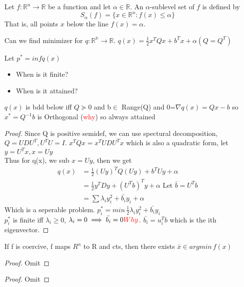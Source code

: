 \begin{definition}
  Let $f: \mathbb R^n \to \mathbb R$ be a function and let $\alpha \in \mathbb R$. An $\alpha$-sublevel set of $f$ is defined by $$S_\alpha(f) = \{x \in \mathbb R^n: f(x) \leq \alpha\}$$
  That is, all points $x$ below the line $f(x) = \alpha$.
\end{definition}

\begin{problem}
  Can we find minimizer for $q:\mathbb{R^n}\rightarrow \mathbb{R}$.
  $q(x)=\frac{1}{2}x^TQx+b^Tx+\alpha(Q=Q^T)$
  
  Let $p^*=inf q(x)$ 
  \begin{itemize}
    \item When is it finite?
    \item When is it attained?
  \end{itemize} 
  
\end{problem}

\begin{proposition}
   $q(x)$ is bdd below iff $Q\succeq 0$ and b$\in$ Range(Q) and 0=$\nabla q(x)=Qx-b$ so $x^*=Q^{-1}b$ is Orthogonal (\textcolor{red}{why}) so always attained


\end{proposition}
\begin{proof}
  Since Q is positive semidef, we can use spectural decomposition,
  $Q=UDU^T,U^TU=I$. $x^TQx=x^TUDU^Tx$ which is also a quadratic form, let $y=U^Tx,x=Uy$
  \\ Thus for q(x), we sub $x=Uy$, then we get 
  \begin{align*}
    q(x) &= \frac{1}{2}(Uy)^TQ(Uy)+b^TUy+\alpha \\
    &= \frac{1}{2}y^TDy+(U^Tb)^Ty+\alpha \text{  Let }\bar{b}=U^Tb \\
    &= \sum\lambda_iy_i^2+\bar{b_i}y_i+\alpha
  \end{align*}
  Which is a seperable problem.
  $p_i^*=min\, \frac{1}{2}\lambda_iy_i^2+\bar{b_i}y_i$
  \\ $p_i^*$ is finite iff $\lambda_i \geq 0$,
  $ \lambda_i=0 \implies \bar{b_i}=0\textcolor{red}{Why}$. 
  $\bar{b_i}=u_i^Tb$ which is the ith eigenvector.
\end{proof}

\begin{proposition}
  If f is coercive, f maps $R^n$ to R and cts, then there exists $\bar{x}\in argmin\,f(x)$
\end{proposition}
\begin{proof}
  Omit
\end{proof}

\begin{theorem}
  
\end{theorem}
\begin{proof}
  Omit
\end{proof}
